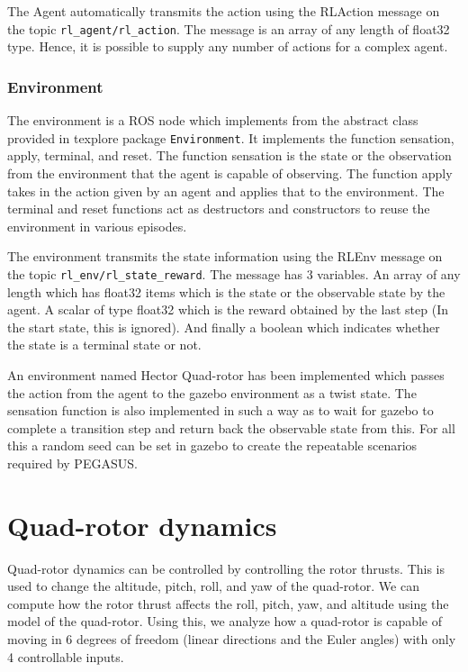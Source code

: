\documentclass[BTech]{iitmdiss}
\begin{document}
The Agent automatically transmits the action using the RLAction message on the topic \texttt{rl\_agent/rl\_action}. The message is an array of any length of float32 type. Hence, it is possible to supply any number of actions for a complex agent.

\subsection*{Environment}

The environment is a ROS node which implements from the abstract class provided in texplore package \texttt{Environment}. It implements the function sensation, apply, terminal, and reset. The function sensation is the state or the observation from the environment that the agent is capable of observing. The function apply takes in the action given by an agent and applies that to the environment. The terminal and reset functions act as destructors and constructors to reuse the environment in various episodes.

The environment transmits the state information using the RLEnv message on the topic \texttt{rl\_env/rl\_state\_reward}. The message has 3 variables. An array of any length which has float32 items which is the state or the observable state by the agent. A scalar of type float32 which is the reward obtained by the last step (In the start state, this is ignored). And finally a boolean which indicates whether the state is a terminal state or not.

An environment named Hector Quad-rotor has been implemented which passes the action from the agent to the gazebo environment as a twist state. The sensation function is also implemented in such a way as to wait for gazebo to complete a transition step and return back the observable state from this. For all this a random seed can be set in gazebo to create the repeatable scenarios required by PEGASUS.

\chapter{Quad-rotor dynamics}

Quad-rotor dynamics can be controlled by controlling the rotor thrusts. This is used to change the altitude, pitch, roll, and yaw of the quad-rotor. We can compute how the rotor thrust affects the roll, pitch, yaw, and altitude using the model of the quad-rotor. Using this, we analyze how a quad-rotor is capable of moving in 6 degrees of freedom (linear directions and the Euler angles) with only 4 controllable inputs.
\end{document}

